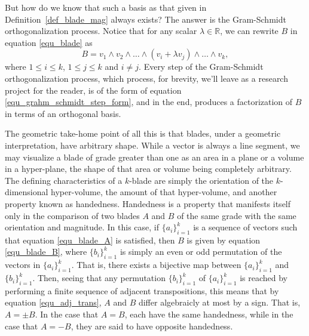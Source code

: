 \documentclass[12pt]{article}
\newcommand{\R}{\mathbb{R}}
\begin{document}
But how do we know that such a basis as that given in Definition~\ref{def_blade_mag} always exists?
The answer is the Gram-Schmidt orthogonalization process.
Notice that for any scalar $\lambda\in\R$,
we can rewrite $B$ in equation \eqref{equ_blade} as
\begin{equation}\label{equ_grahm_schmidt_step_form}
B = v_1\wedge v_2\wedge\dots\wedge(v_i+\lambda v_j)\wedge\dots\wedge v_k,
\end{equation}
where $1\leq i\leq k$, $1\leq j\leq k$ and $i\neq j$.  Every step of the Gram-Schmidt
orthogonalization process, which process, for brevity, we'll leave as a research project for the reader,
is of the form of equation \eqref{equ_grahm_schmidt_step_form}, and in the end, produces
a factorization of $B$ in terms of an orthogonal basis.

The geometric take-home point of all this is that blades, under a geometric interpretation,
have arbitrary shape.  While a vector is always a line segment, we may visualize a blade of
grade greater than one
as an area in a plane or a volume in a hyper-plane, the shape of that area or volume being completely
arbitrary.  The defining characteristics of a $k$-blade are simply the orientation of the $k$-dimensional
hyper-volume, the amount of that hyper-volume, and another property known as handedness.
Handedness is a property
that manifests itself only in the comparison of two blades $A$ and $B$ of the same grade with
the same orientation
and magnitude.  In this case, if $\{a_i\}_{i=1}^k$ is a sequence of vectors such
that equation \eqref{equ_blade_A} is satisfied, then $B$ is given by equation
\eqref{equ_blade_B}, where $\{b_i\}_{i=1}^k$ is simply an even or odd permutation
of the vectors in $\{a_i\}_{i=1}^k$.  That is, there exists a bijective map between
$\{a_i\}_{i=1}^k$ and $\{b_i\}_{i=1}^k$.
Then, seeing that any permutation $\{b_i\}_{i=1}^k$ of $\{a_i\}_{i=1}^k$
is reached by performing a finite sequence of adjacent transpositions, this means that
by equation \eqref{equ_adj_trans}, $A$ and $B$ differ algebraicly at most by a sign.
That is, $A=\pm B$.  In the case that $A=B$, each have the same handedness,
while in the case that $A=-B$, they are said to have opposite handedness.
\end{document}
